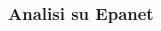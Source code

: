 \documentclass{beamer}
\begin{document}
%
\begin{frame}
\frametitle{Analisi su Epanet}
	\begin{columns}
	 \begin{column}{.5\textwidth}
	  \begin{figure}
	   \centering
	   \begin{overprint}
	   \vspace{.5mm}
	   \begin{center}
	   \end{center}
%

\end{overprint}
\end{figure}
\end{column}
\end{columns}
\end{frame}
\end{document}
